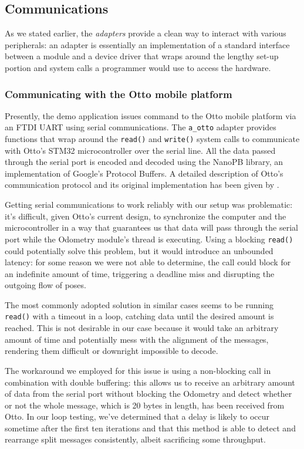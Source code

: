 \documentclass[a4paper,12pt]{report}
\begin{document}
\subsection{Communications}

As we stated earlier, the \textit{adapters} provide a clean way to interact with various peripherals: an adapter is essentially an implementation of a standard interface between a module and a device driver that wraps around the lengthy set-up portion and system calls a programmer would use to access the hardware.

\subsubsection{Communicating with the Otto mobile platform}

Presently, the demo application issues command to the Otto mobile platform via an FTDI UART using serial communications. The \texttt{a\_otto} adapter provides functions that wrap around the \texttt{read()} and \texttt{write()} system calls to communicate with Otto's STM32 microcontroller over the serial line. All the data passed through the serial port is encoded and decoded using the NanoPB library, an implementation of Google's Protocol Buffers. A detailed description of Otto's communication protocol and its original implementation has been given by \textcite{fdila-bs-otto}.

Getting serial communications to work reliably with our setup was problematic: it's difficult, given Otto's current design, to synchronize the computer and the microcontroller in a way that guarantees us that data will pass through the serial port while the Odometry module's thread is executing. Using a blocking \texttt{read()} could potentially solve this problem, but it would introduce an unbounded latency: for some reason we were not able to determine, the call could block for an indefinite amount of time, triggering a deadline miss and disrupting the outgoing flow of poses.

The most commonly adopted solution in similar cases seems to be running \texttt{read()} with a timeout in a loop, catching data until the desired amount is reached. This is not desirable in our case because it would take an arbitrary amount of time and potentially mess with the alignment of the messages, rendering them difficult or downright impossible to decode. 

The workaround we employed for this issue is using a non-blocking call in combination with double buffering: this allows us to receive an arbitrary amount of data from the serial port without blocking the Odometry and detect whether or not the whole message, which is 20 bytes in length, has been received from Otto. In our loop testing, we've determined that a delay is likely to occur sometime after the first ten iterations and that this method is able to detect and rearrange split messages consistently, albeit sacrificing some throughput.
\end{document}
